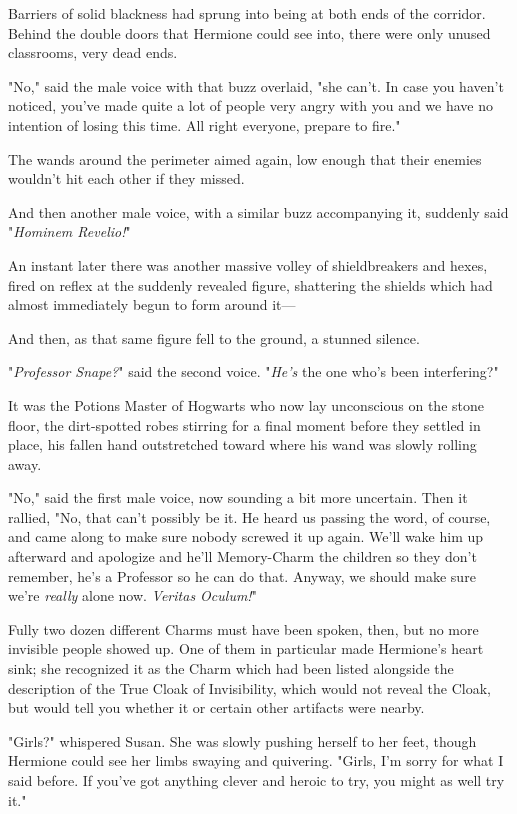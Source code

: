 Barriers of solid blackness had sprung into being at both ends of the corridor.
Behind the double doors that Hermione could see into, there were only unused
classrooms, very dead ends.

"No," said the male voice with that buzz overlaid, "she can't. In case you
haven't noticed, you've made quite a lot of people very angry with you and we
have no intention of losing this time. All right everyone, prepare to fire."

The wands around the perimeter aimed again, low enough that their enemies
wouldn't hit each other if they missed.

And then another male voice, with a similar buzz accompanying it, suddenly said
"\emph{Hominem Revelio!}"

An instant later there was another massive volley of shieldbreakers and hexes,
fired on reflex at the suddenly revealed figure, shattering the shields which
had almost immediately begun to form around it---

And then, as that same figure fell to the ground, a stunned silence.

"\emph{Professor Snape?}" said the second voice. "\emph{He's} the one who's
been interfering?"

It was the Potions Master of Hogwarts who now lay unconscious on the stone
floor, the dirt-spotted robes stirring for a final moment before they settled
in place, his fallen hand outstretched toward where his wand was slowly rolling
away.

"No," said the first male voice, now sounding a bit more uncertain. Then it
rallied, "No, that can't possibly be it. He heard us passing the word, of
course, and came along to make sure nobody screwed it up again. We'll wake him
up afterward and apologize and he'll Memory-Charm the children so they don't
remember, he's a Professor so he can do that. Anyway, we should make sure we're
\emph{really} alone now. \emph{Veritas Oculum!}"

Fully two dozen different Charms must have been spoken, then, but no more
invisible people showed up. One of them in particular made Hermione's heart
sink; she recognized it as the Charm which had been listed alongside the
description of the True Cloak of Invisibility, which would not reveal the
Cloak, but would tell you whether it or certain other artifacts were nearby.

"Girls?" whispered Susan. She was slowly pushing herself to her feet, though
Hermione could see her limbs swaying and quivering. "Girls, I'm sorry for what
I said before. If you've got anything clever and heroic to try, you might as
well try it."

